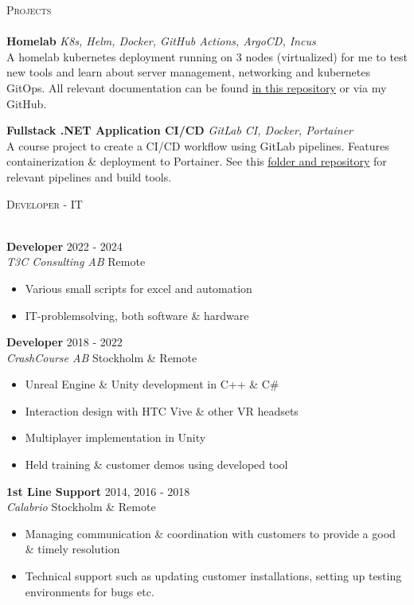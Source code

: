 \documentclass[a4paper]{article}
\newcommand{\lineunder} {
    \vspace*{-8pt} \\
    \hspace*{-18pt} \hrulefill \\
}
\newcommand{\header} [1] {
    {\hspace*{-18pt}\vspace*{6pt} \textsc{#1}}
    \vspace*{-6pt} \lineunder
}
\begin{document}
\header{Projects}
{\textbf{Homelab}} {\sl K8s, Helm, Docker, GitHub Actions, ArgoCD, Incus} \\
A homelab kubernetes deployment running on 3 nodes (virtualized) for me to test new tools and learn about server management, networking and kubernetes GitOps. All relevant documentation can be found \href{https://github.com/pontusc/homelab}{in this repository} or via my GitHub.\\
\vspace{4mm}

{\textbf{Fullstack .NET Application CI/CD}} {\sl GitLab CI, Docker, Portainer} \\
A course project to create a CI/CD workflow using GitLab pipelines. Features containerization & deployment to Portainer. See this \href{https://github.com/pontusc/devops-doe24/tree/main/pipeline-utilities}{folder and repository} for relevant pipelines and build tools.\\
\vspace{8mm}

\header{Developer - IT}
\vspace{4mm}

\textbf{Developer} \hfill 2022 - 2024\\
\textit{T3C Consulting AB} \hfill Remote\\
\vspace{-1mm}
\begin{itemize} \itemsep 1pt
  \item Various small scripts for excel and automation
  \item IT-problemsolving, both software \& hardware
\end{itemize}
\vspace{1mm}
\textbf{Developer} \hfill 2018 - 2022\\
\textit{CrashCourse AB} \hfill Stockholm \& Remote\\
\vspace{-1mm}
\begin{itemize} \itemsep 1pt
  \item Unreal Engine \& Unity development in C++ \& C\#
  \item Interaction design with HTC Vive \& other VR headsets
  \item Multiplayer implementation in Unity
  \item Held training \& customer demos using developed tool
\end{itemize}
\vspace{1mm}
\textbf{1st Line Support} \hfill 2014, 2016 - 2018\\
\textit{Calabrio} \hfill Stockholm \& Remote\\
\vspace{-1mm}
\begin{itemize} \itemsep 1pt
  \item Managing communication \& coordination with customers to provide a good \& timely resolution
  \item Technical support such as updating customer installations, setting up testing environments for bugs etc.
\end{itemize}
\vspace{8mm}
\ 
\end{document}
